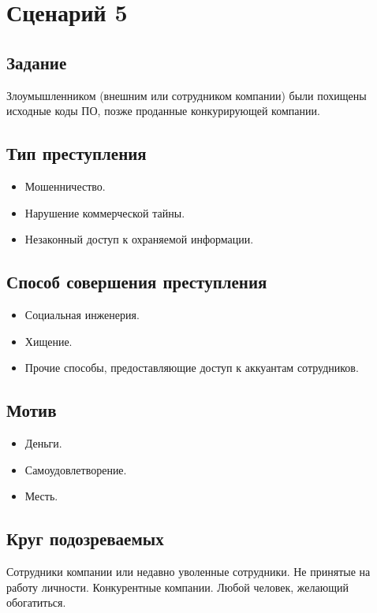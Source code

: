 \section*{Сценарий 5}

\subsection*{Задание}
Злоумышленником (внешним или сотрудником компании) были похищены исходные коды
ПО, позже проданные конкурирующей компании.


\subsection*{Тип преступления}
\begin{itemize}
  \item Мошенничество.
  \item Нарушение коммерческой тайны.
  \item Незаконный доступ к охраняемой информации.
\end{itemize}

\subsection*{Способ совершения преступления}
\begin{itemize}
  \item Социальная инженерия.
  \item Хищение.
  \item Прочие способы, предоставляющие доступ к аккуантам сотрудников.
\end{itemize}

\subsection*{Мотив}
\begin{itemize}
  \item Деньги.
  \item Самоудовлетворение.
  \item Месть.
\end{itemize}

\subsection*{Круг подозреваемых}
Сотрудники компании или недавно уволенные сотрудники. Не принятые на работу 
личности. Конкурентные компании. Любой человек, желающий обогатиться.

